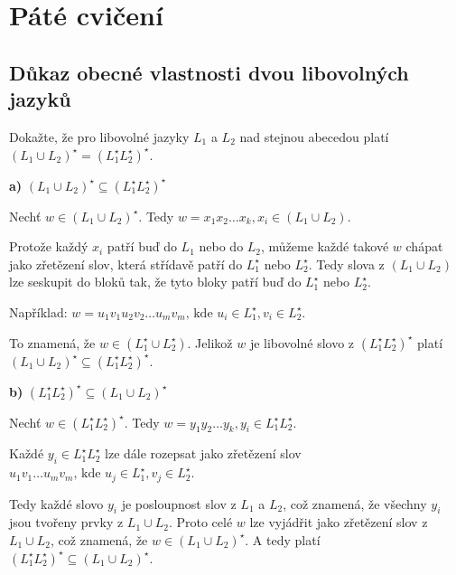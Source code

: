 \section{Páté cvičení}

\subsection{Důkaz obecné vlastnosti dvou libovolných jazyků}
Dokažte, že pro libovolné jazyky $L_1$ a $L_2$ nad stejnou abecedou platí $(L_1 \cup L_2)^\star = (L_1^\star L_2^\star)^\star$.

\textbf{a)} $(L_1 \cup L_2)^\star \subseteq (L_1^\star L_2^\star)^\star$

Nechť $w \in (L_1 \cup L_2)^\star$. Tedy $w = x_1 x_2 \dots x_k, x_i \in (L_1 \cup L_2)$.

Protože každý $x_i$ patří buď do $L_1$ nebo do $L_2$, můžeme každé takové $w$ chápat jako zřetězení slov, která střídavě
patří do $L_1^\star$ nebo $L_2^\star$. Tedy slova z $(L_1 \cup L_2)$ lze seskupit do bloků tak, že tyto bloky patří buď do
$L_1^\star$ nebo $L_2^\star$.

Například: $w = u_1 v_1 u_2 v_2 \dots u_m v_m \text{, kde } u_i \in L_1^\star, v_i \in L_2^\star$.

To znamená, že $w \in (L_1^\star \cup L_2^\star)$. Jelikož $w$ je libovolné slovo z $(L_1^\star L_2^\star)^\star$ platí
$(L_1 \cup L_2)^\star \subseteq (L_1^\star L_2^\star)^\star$.

\textbf{b)} $(L_1^\star L_2^\star)^\star \subseteq (L_1 \cup L_2)^\star$

Nechť $w \in (L_1^\star L_2^\star)^\star$. Tedy $w = y_1 y_2 \dots y_k, y_i \in L_1^\star L_2^\star$.

Každé $y_i \in L_1^\star L_2^\star$ lze dále rozepsat jako zřetězení slov $u_1 v_1 \dots u_m v_m \text{, kde } u_j \in 
L_1^\star, v_j \in L_2^\star$.

Tedy každé slovo $y_i$ je posloupnost slov z $L_1$ a $L_2$, což znamená, že všechny $y_i$ jsou tvořeny prvky z $L_1 \cup L_2$.
Proto celé $w$ lze vyjádřit jako zřetězení slov z $L_1 \cup L_2$, což znamená, že $w \in (L_1 \cup L_2)^\star$. A tedy
platí $(L_1^\star L_2^\star)^\star \subseteq (L_1 \cup L_2)^\star$.

